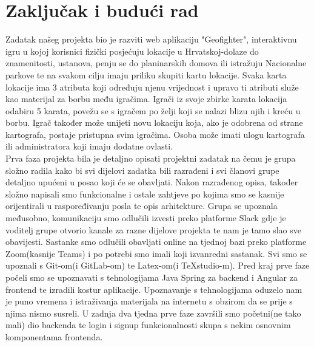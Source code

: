 \chapter{Zaključak i budući rad}
		
		\textnormal{Zadatak našeg projekta bio je razviti web aplikaciju "Geofighter", interaktivnu igru u kojoj korisnici fizički posjećuju lokacije u Hrvatskoj-dolaze do znamenitosti, ustanova, penju se do planinarskih domova ili istražuju Nacionalne parkove te na svakom cilju imaju priliku skupiti kartu lokacije. Svaka karta lokacije ima 3 atributa koji određuju njenu vrijednost i upravo ti atributi služe kao materijal za borbu među igračima. Igrači iz svoje zbirke karata lokacija odabiru 5 karata, povežu se s igračem po želji koji se nalazi blizu njih i kreću u borbu. Igrač također može unijeti novu lokaciju koja, ako je odobrena od strane kartografa, postaje pristupna svim igračima. Osoba može imati ulogu kartografa ili administratora koji imaju dodatne ovlasti.}\\
		 
		 \textnormal{Prva faza projekta bila je detaljno opisati projektni zadatak na čemu je grupa složno radila kako bi svi dijelovi zadatka bili razrađeni i svi članovi grupe detaljno upućeni u posao koji će se obavljati. Nakon razrađenog opisa, također složno napisali smo funkcionalne i ostale zahtjeve po kojima smo se kasnije orijentirali u raspoređivanju posla te opis arhitekture. Grupa se upoznala međusobno, komunikaciju smo odlučili izvesti preko platforme Slack gdje je voditelj grupe otvorio kanale za razne dijelove projekta te nam je tamo slao sve obavijesti. Sastanke smo odlučili obavljati online na tjednoj bazi preko platforme Zoom(kasnije Teams) i po potrebi smo imali koji izvanredni sastanak. Svi smo se upoznali s Git-om(i GitLab-om) te Latex-om(i TeXstudio-m). Pred kraj prve faze počeli smo se upoznavati s tehnologijama Java Spring za backend i Angular za frontend te izradili kostur aplikacije. Upoznavanje s tehnologijama oduzelo nam je puno vremena i istraživanja materijala na internetu s obzirom da se prije s njima nismo susreli. U zadnja dva tjedna prve faze završili smo početni(ne tako mali) dio backenda te login i signup funkcionalnosti skupa s nekim osnovnim komponentama frontenda.}\\
		 
